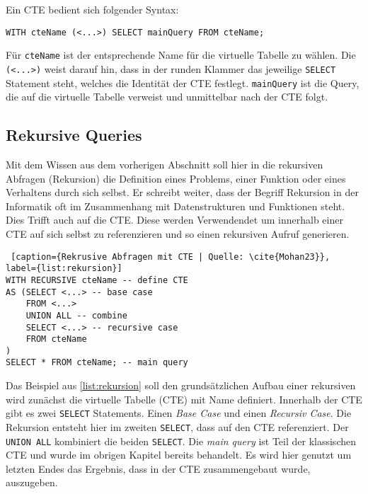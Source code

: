 Ein CTE bedient sich folgender Syntax:

\texttt{WITH cteName (<...>) SELECT mainQuery FROM cteName;}

Für \texttt{cteName} ist der entsprechende Name für die virtuelle Tabelle zu wählen.
Die \texttt{(<...>)} weist darauf hin, dass in der runden Klammer das jeweilige
\texttt{SELECT} Statement steht, welches die Identität der CTE festlegt. \texttt{mainQuery}
ist die Query, die auf die virtuelle Tabelle verweist und unmittelbar nach der CTE
folgt.

\subsection{Rekursive Queries}
Mit dem Wissen aus dem vorherigen Abschnitt soll hier in die rekursiven Abfragen
(Rekursion) die Definition eines Problems, einer Funktion oder eines Verhaltens
durch sich selbst. Er schreibt weiter, dass der Begriff Rekursion in der
Informatik oft im Zusammenhang mit Datenstrukturen und Funktionen steht. Dies Trifft
auch auf die CTE. Diese werden Verwendendet um innerhalb einer CTE auf sich
selbst zu referenzieren und so einen rekursiven Aufruf generieren.

\begin{lstlisting} [caption={Rekrusive Abfragen mit CTE | Quelle: \cite{Mohan23}}, label={list:rekursion}]
WITH RECURSIVE cteName -- define CTE
AS (SELECT <...> -- base case
	FROM <...>
	UNION ALL -- combine
	SELECT <...> -- recursive case
	FROM cteName
)
SELECT * FROM cteName; -- main query
\end{lstlisting}

Das Beispiel aus \ref{list:rekursion} soll den grundsätzlichen Aufbau einer rekursiven
wird zunächst die virtuelle Tabelle (CTE) mit Name definiert. Innerhalb der CTE
gibt es zwei \texttt{SELECT} Statements. Einen \textit{Base Case} und einen \textit{Recursiv
Case}. Die Rekursion entsteht hier im zweiten \texttt{SELECT}, dass auf den CTE referenziert.
Der \texttt{UNION ALL} kombiniert die beiden \texttt{SELECT}. Die \textit{main
query} ist Teil der klassischen CTE und wurde im obrigen Kapitel bereits
behandelt. Es wird hier genutzt um letzten Endes das Ergebnis, dass in der CTE
zusammengebaut wurde, auszugeben.



